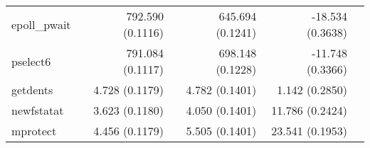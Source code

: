 \begin{longtable}{>{\ttfamily}lrrrr}
                   epoll\_pwait &           792.590 (0.1116) &           645.694 (0.1241) &  -18.534 (0.3638) \\
                       pselect6 &           791.084 (0.1117) &           698.148 (0.1228) &  -11.748 (0.3366) \\
                       getdents &             4.728 (0.1179) &             4.782 (0.1401) &    1.142 (0.2850) \\
                     newfstatat &             3.623 (0.1180) &             4.050 (0.1401) &   11.786 (0.2424) \\
                       mprotect &             4.456 (0.1179) &             5.505 (0.1401) &   23.541 (0.1953) \\
\end{longtable}
